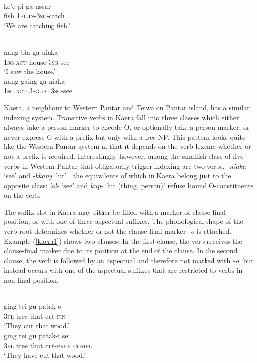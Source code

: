 \ea \label{wp01}
\\
\gll ke'e pi-ga-ussar \\
fish \textsc{1}\textsc{pl}.\textsc{in}-\textsc{3}\textsc{sg}-catch \\
\glft `We are catching fish.'\\ 
\z

\ea
{}\\
\ea \label{wp02a}
\gll nang bla ga-niaka \\
\textsc{1}\textsc{sg}.\textsc{act} house \textsc{3}\textsc{sg}-see \\
\glft `I saw the house.' \\ 
\ex \label{wp02b}
\gll *nang gaing ga-niaka \\ 
\textsc{1}\textsc{sg}.\textsc{act} \textsc{3}\textsc{sg}.\textsc{ug} \textsc{3}\textsc{sg}-see \\
\z
\z

Kaera, a neighbour to Western Pantar and Teiwa on Pantar island, has a similar indexing system. Transitive verbs in Kaera fall into three classes which either always take a person-marker to encode O, or optionally take a person-marker, or never express O with a prefix but only with a free NP. This pattern looks quite like the Western Pantar system in that it depends on the verb lexeme whether or not a prefix is required. Interestingly, however, among the smallish class of five verbs in Western Pantar that obligatorily trigger indexing are two verbs, \textit{-niaka} `see' and \textit{-kkang} `hit' \citep[77]{holton2014western}, the equivalents of which in Kaera belong just to the opposite class: \textit{lal-} `see' and \textit{kup-} `hit (thing, person)' refuse bound O-constituents on the verb. 

The suffix slot in Kaera may either be filled with a marker of clause-final position, or with one of three aspectual suffixes. The phonological shape of the verb root determines whether or not the clause-final marker \textit{-o} is attached. Example (\ref{kaera1}) shows two clauses. In the first clause, the verb receives the clause-final marker due to its position at the end of the clause. In the second clause, the verb is followed by an aspectual and therefore not marked with \textit{-o}, but instead occurs with one of the aspectual suffixes that are restricted to verbs in non-final position.

\ea \label{kaera1}
 \\
\ea
\gll ging tei gu patak-o \\
\textsc{3}\textsc{pl} tree that cut-\textsc{fin} \\
\glft `They cut that wood.' \\ 
\ex
\gll ging tei gu patak-i sei \\ 
\textsc{3}\textsc{pl} tree that cut-\textsc{prfv} \textsc{compl} \\
\glft `They have cut that wood.'\\ 
\z
\z

